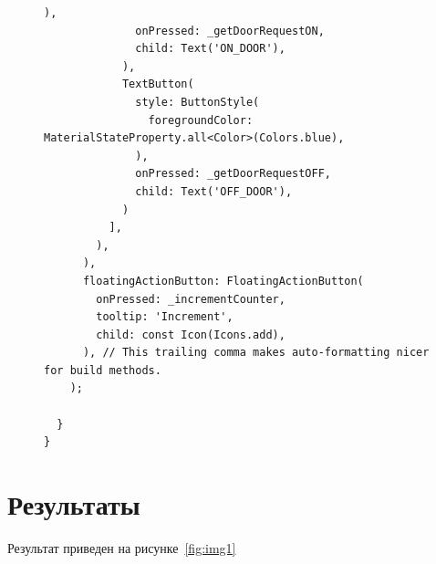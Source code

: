 \documentclass[a4paper, 14pt]{extarticle}
\begin{document}
\begin{figure}[H]
\begin{lstlisting}[language={},caption={Реализация мобильного приложения},label={lst:code1}]
              ),
              onPressed: _getDoorRequestON,
              child: Text('ON_DOOR'),
            ),
            TextButton( 
              style: ButtonStyle(
                foregroundColor: MaterialStateProperty.all<Color>(Colors.blue),
              ),
              onPressed: _getDoorRequestOFF,
              child: Text('OFF_DOOR'),
            )
          ],
        ),
      ),
      floatingActionButton: FloatingActionButton(
        onPressed: _incrementCounter,
        tooltip: 'Increment',
        child: const Icon(Icons.add),
      ), // This trailing comma makes auto-formatting nicer for build methods.
    );

  }
}

\end{lstlisting}
\end{figure}


\section{Результаты}

Результат приведен на рисунке~\ref{fig:img1}
\end{document}
